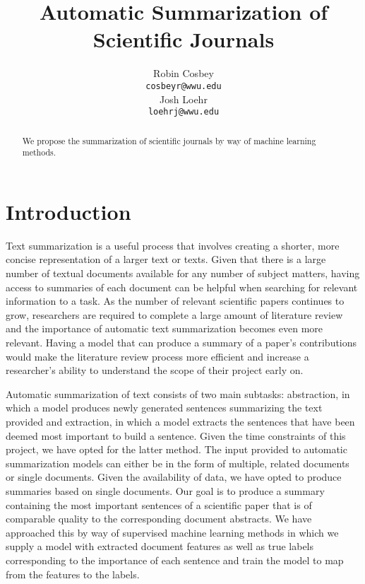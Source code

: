 \documentclass[11pt]{article}
\begin{document}
\title{Automatic Summarization of Scientific Journals}

\author{Robin Cosbey \\
  {\tt cosbeyr@wwu.edu} \\\And
  Josh Loehr \\
  {\tt loehrj@wwu.edu} \\}

\maketitle

\begin{abstract}
  We propose the summarization of scientific journals by way of machine learning methods.
\end{abstract}

\section{Introduction}
	Text summarization is a useful process that involves creating a shorter, more concise representation of a larger text or texts. Given that there is a large number of textual documents available for any number of subject matters, having access to summaries of each document can be helpful when searching for relevant information to a task. As the number of relevant scientific papers continues to grow, researchers are required to complete a large amount of literature review and the importance of automatic text summarization becomes even more relevant. Having a model that can produce a summary of a paper’s contributions would make the literature review process more efficient and increase a researcher’s ability to understand the scope of their project early on. 

	Automatic summarization of text consists of two main subtasks: abstraction, in which a model produces newly generated sentences summarizing the text provided and extraction, in which a model extracts the sentences that have been deemed most important to build a sentence. Given the time constraints of this project, we have opted for the latter method. The input provided to automatic summarization models can either be in the form of multiple, related documents or single documents. Given the availability of data, we have opted to produce summaries based on single documents. Our goal is to produce a summary containing the most important sentences of a scientific paper that is of comparable quality to the corresponding document abstracts. 
	We have approached this by way of supervised machine learning methods in which we supply a model with extracted document features as well as true labels corresponding to the importance of each sentence and train the model to map from the features to the labels.
\end{document}
